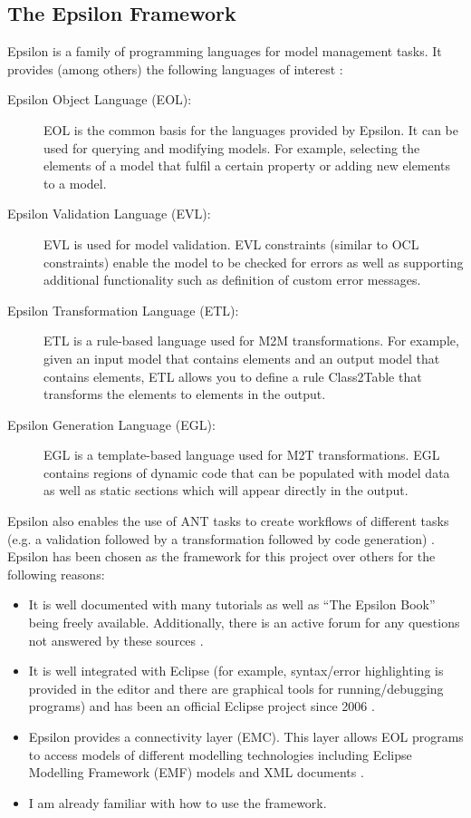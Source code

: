 \documentclass{UoYCSproject}
\begin{document}
\subsection{The Epsilon Framework}
Epsilon is a family of programming languages for model management tasks. It provides (among others) the following languages of interest \parencite{kolovos2010epsilon}:
\begin{description}
\item[Epsilon Object Language (EOL):] EOL is the common basis for the languages provided by Epsilon. It can be used for querying and modifying models. For example, selecting the elements of a model that fulfil a certain property or adding new elements to a model.
\item[Epsilon Validation Language (EVL):] EVL is used for model validation. EVL constraints (similar to OCL constraints) enable the model to be checked for errors as well as supporting additional functionality such as definition of custom error messages.
\item[Epsilon Transformation Language (ETL):] ETL is a rule-based language used for M2M transformations. For example, given an input model  that contains  elements and an output model  that contains  elements, ETL allows you to define a rule Class2Table that transforms the  elements to  elements in the output.
\item[Epsilon Generation Language (EGL):] EGL is a template-based language used for M2T transformations. EGL contains regions of dynamic code that can be populated with model data as well as static sections which will appear directly in the output. 
\end{description}
Epsilon also enables the use of ANT tasks to create workflows of different tasks (e.g. a validation followed by a
transformation followed by code generation) \parencite{kolovos2010epsilon}.
\newline
Epsilon has been chosen as the framework for this project over others for the following reasons:
\begin{itemize}
\item It is well documented with many tutorials as well as ``The Epsilon Book'' being freely available. Additionally, there is an active forum for any questions not answered by these sources \parencite{epsilonsite}.
\item It is well integrated with Eclipse (for example, syntax/error highlighting is provided in the editor and there are graphical tools for running/debugging programs) and has been an official Eclipse project since 2006 \parencite{epsilonsite}.
\item Epsilon provides a connectivity layer (EMC). This layer allows EOL programs to access models of different modelling technologies including Eclipse Modelling Framework (EMF) models and XML documents \parencite{epsilonsite}.
\item I am already familiar with how to use the framework.
\end{itemize}
\end{document}

